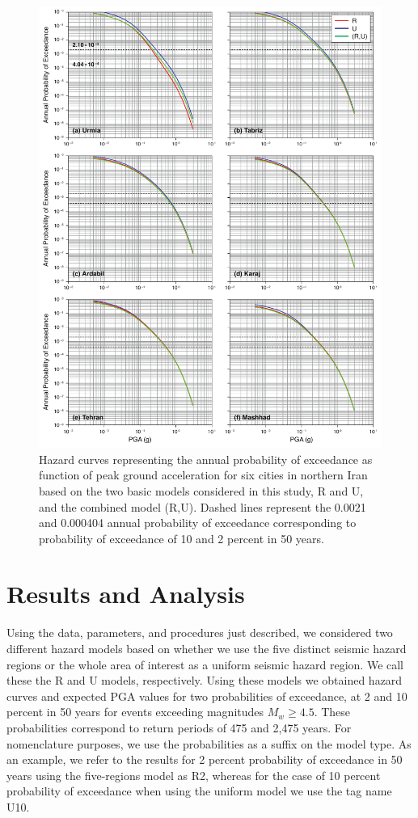 

\begin{figure}%
    \centering
    \includegraphics[width=\textwidth]{figures/pdf/figure-13}
    \caption{Hazard curves representing the annual probability of exceedance as function of peak ground acceleration for six cities in northern Iran based on the two basic models considered in this study, R and U, and the combined model (R,U). Dashed lines represent the 0.0021 and 0.000404 annual probability of exceedance corresponding to probability of exceedance of 10 and 2 percent in 50 years.}
    \label{fig:hazardcurve}
\end{figure}

\section{Results and Analysis}

Using the data, parameters, and procedures just described, we considered two different hazard models based on whether we use the five distinct seismic hazard regions or the whole area of interest as a uniform seismic hazard region. We call these the R and U models, respectively. Using these models we obtained hazard curves and expected PGA values for two probabilities of exceedance, at 2 and 10 percent in 50 years for events exceeding magnitudes $M_w \geq 4.5$. These probabilities correspond to return periods of 475 and 2,475 years. For nomenclature purposes, we use the probabilities as a suffix on the model type. As an example, we refer to the results for 2 percent probability of exceedance in 50 years using the five-regions model as R2, whereas for the case of 10 percent probability of exceedance when using the uniform model we use the tag name U10.

